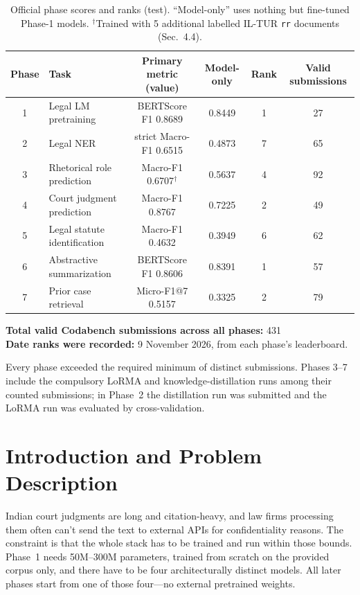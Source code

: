 \documentclass[11pt, oneside]{article}
\begin{document}
\begin{table}[H]
\centering
\small
\caption{Official phase scores and ranks (test). ``Model-only'' uses nothing but fine-tuned Phase-1 models.
$^{\dagger}$Trained with 5 additional labelled IL-TUR \texttt{rr} documents (Sec.~4.4).}
\label{tab:leaderboard}
\setlength{\tabcolsep}{3.5pt}
\begin{tabular}{clcccc}
\toprule
Phase & Task & Primary metric (value) & Model-only & Rank & Valid submissions \\
\midrule
1 & Legal LM pretraining & BERTScore F1 0.8689 & 0.8449 & 1 & 27 \\
2 & Legal NER & strict Macro-F1 0.6515 & 0.4873 & 7 & 65 \\
3 & Rhetorical role prediction & Macro-F1 0.6707$^{\dagger}$ & 0.5637 & 4 & 92 \\
4 & Court judgment prediction & Macro-F1 0.8767 & 0.7225 & 2 & 49 \\
5 & Legal statute identification & Macro-F1 0.4632 & 0.3949 & 6 & 62 \\
6 & Abstractive summarization & BERTScore F1 0.8606 & 0.8391 & 1 & 57 \\
7 & Prior case retrieval & Micro-F1@7 0.5157 & 0.3325 & 2 & 79 \\
\bottomrule
\end{tabular}
\end{table}
\noindent
\textbf{Total valid Codabench submissions across all phases:} 431\\
\textbf{Date ranks were recorded:} 9 November 2026, from each phase's leaderboard.
\medskip

Every phase exceeded the required minimum of distinct submissions. Phases 3--7 include the
compulsory LoRMA and knowledge-distillation runs among their counted submissions; in Phase~2 the
distillation run was submitted and the LoRMA run was evaluated by cross-validation.

\section{Introduction and Problem Description}
Indian court judgments are long and citation-heavy, and law firms processing them often can't send
the text to external APIs for confidentiality reasons. The constraint is that the whole stack has to
be trained and run within those bounds. Phase~1 needs 50M--300M parameters, trained from scratch on
the provided corpus only, and there have to be four architecturally distinct models. All later
phases start from one of those four---no external pretrained weights.
\end{document}
